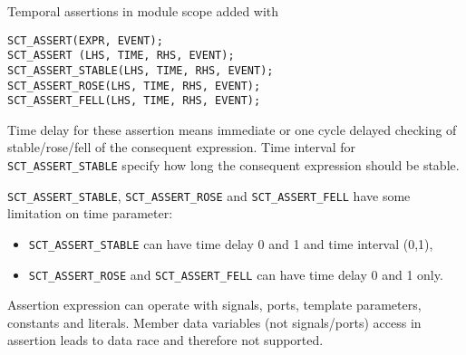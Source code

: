 Temporal assertions in module scope added with 

\begin{lstlisting}[style=mycpp]
SCT_ASSERT(EXPR, EVENT);
SCT_ASSERT (LHS, TIME, RHS, EVENT);
SCT_ASSERT_STABLE(LHS, TIME, RHS, EVENT);      
SCT_ASSERT_ROSE(LHS, TIME, RHS, EVENT);        
SCT_ASSERT_FELL(LHS, TIME, RHS, EVENT); 
\end{lstlisting}
%
Time delay for these assertion means immediate or one cycle delayed checking of stable/rose/fell of the consequent expression. Time interval for {\tt SCT\_ASSERT\_STABLE} specify how long the consequent expression should be stable.

{\tt SCT\_ASSERT\_STABLE}, {\tt SCT\_ASSERT\_ROSE} and {\tt SCT\_ASSERT\_FELL} have some limitation on time parameter:
\begin{itemize}
\item {\tt SCT\_ASSERT\_STABLE} can have time delay 0 and 1 and time interval (0,1),
\item {\tt SCT\_ASSERT\_ROSE} and {\tt SCT\_ASSERT\_FELL} can have time delay 0 and 1 only.
\end{itemize}


Assertion expression can operate with signals, ports, template parameters, constants and literals. Member data variables (not signals/ports) access in assertion leads to data race and therefore not supported. 

